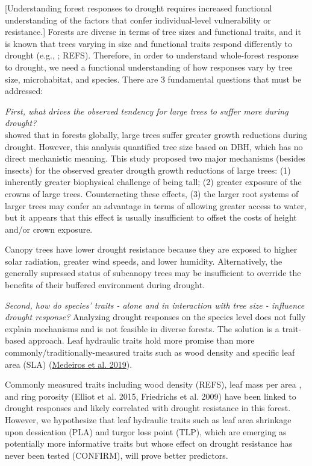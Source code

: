 \documentclass[]{article}
\begin{document}
{[}Understanding forest responses to drought requires increased
functional understanding of the factors that confer individual-level
vulnerability or resistance.{]} Forests are diverse in terms of tree
sizes and functional traits, and it is known that trees varying in size
and functional traits respond differently to drought (e.g.,
\citep{bennett_larger_2015}; REFS). Therefore, in order to understand
whole-forest response to drought, we need a functional understanding of
how responses vary by tree size, microhabitat, and species. There are 3
fundamental questions that must be addressed:

\emph{First, what drives the observed tendency for large trees to suffer
more during drought?}\\
\citet{bennett_larger_2015} showed that in forests globally, large trees
suffer greater growth reductions during drought. However, this analysis
quantified tree size based on DBH, which has no direct mechanistic
meaning. This study proposed two major mechanisms (besides insects) for
the observed greater drougth growth reductions of large trees: (1)
inherently greater biophysical challenge of being tall; (2) greater
exposure of the crowns of large trees. Counteracting these effects, (3)
the larger root systems of larger trees may confer an advantage in terms
of allowing greater access to water, but it appears that this effect is
usually insufficient to offset the costs of height and/or crown
exposure.

Canopy trees have lower drought resistance because they are exposed to
higher solar radiation, greater wind speeds, and lower humidity.
Alternatively, the generally supressed status of subcanopy trees may be
insufficient to override the benefits of their buffered environment
during drought.

\emph{Second, how do species' traits - alone and in interaction with
tree size - influence drought response?} Analyzing drought responses on
the species level does not fully explain mechanisms and is not feasible
in diverse forests. The solution is a trait-based approach. Leaf
hydraulic traits hold more promise than more
commonly/traditionally-measured traits such as wood density and specific
leaf area (SLA)
(\href{https://besjournals.onlinelibrary.wiley.com/doi/abs/10.1111/1365-2435.13229}{Medeiros
et al. 2019}).

Commonly measured traits including wood density (REFS), leaf mass per
area \citep{abrams_adaptations_1990} \citep{guerfel_impacts_2009}, and
ring porosity (Elliot et al. 2015, Friedrichs et al. 2009) have been
linked to drought responses and likely correlated with drought
resistance in this forest. However, we hypothesize that leaf hydraulic
traits such as leaf area shrinkage upon dessication (PLA) and turgor
loss point (TLP), which are emerging as potentially more informative
traits but whose effect on drought resistance has never been tested
(CONFIRM), will prove better predictors.
\end{document}
